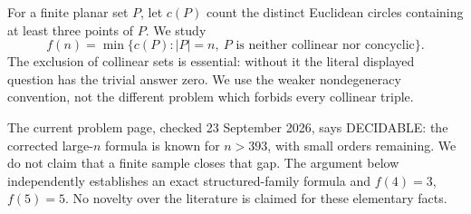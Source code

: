 For a finite planar set $P$, let $c(P)$ count the distinct Euclidean circles containing at least three points of $P$. We study
\[
 f(n)=\min\{c(P):|P|=n,\ P\text{ is neither collinear nor concyclic}\}.
\]
The exclusion of collinear sets is essential: without it the literal displayed question has the trivial answer zero. We use the weaker nondegeneracy convention, not the different problem which forbids every collinear triple.

The current problem page, checked 23 September 2026, says DECIDABLE: the corrected large-$n$ formula is known for $n>393$, with small orders remaining. We do not claim that a finite sample closes that gap. The argument below independently establishes an exact structured-family formula and $f(4)=3$, $f(5)=5$. No novelty over the literature is claimed for these elementary facts.
